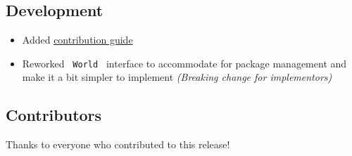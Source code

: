 \subsection{Development}\label{development}

\begin{itemize}
\tightlist
\item
  Added
  \href{https://github.com/typst/typst/blob/main/CONTRIBUTING.md}{contribution
  guide}
\item
  Reworked \texttt{\ World\ } interface to accommodate for package
  management and make it a bit simpler to implement \emph{(Breaking
  change for implementors)}
\end{itemize}

\subsection{Contributors}\label{contributors}

Thanks to everyone who contributed to this release!

